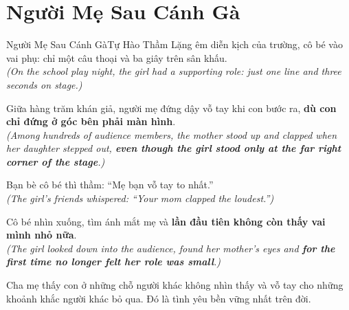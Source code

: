 \section{Người Mẹ Sau Cánh Gà}
\begin{truyen}{Người Mẹ Sau Cánh Gà}{Tự Hào Thầm Lặng}
êm diễn kịch của trường, cô bé vào vai phụ: chỉ một câu thoại và ba giây trên sân khấu.\\
\textit{(On the school play night, the girl had a supporting role: just one line and three seconds on stage.)}

Giữa hàng trăm khán giả, người mẹ đứng dậy vỗ tay khi con bước ra, \textbf{dù con chỉ đứng ở góc bên phải màn hình}.\\
\textit{(Among hundreds of audience members, the mother stood up and clapped when her daughter stepped out, \textbf{even though the girl stood only at the far right corner of the stage}.)}

Bạn bè cô bé thì thầm: ``Mẹ bạn vỗ tay to nhất.''\\
\textit{(The girl's friends whispered: ``Your mom clapped the loudest.'')}

Cô bé nhìn xuống, tìm ánh mắt mẹ và \textbf{lần đầu tiên không còn thấy vai mình nhỏ nữa}.\\
\textit{(The girl looked down into the audience, found her mother's eyes and \textbf{for the first time no longer felt her role was small}.)}
\end{truyen}
\begin{baihoc}
  Cha mẹ thấy con ở những chỗ người khác không nhìn thấy và vỗ tay cho những khoảnh khắc người khác bỏ qua. Đó là tình yêu bền vững nhất trên đời.
\end{baihoc}
